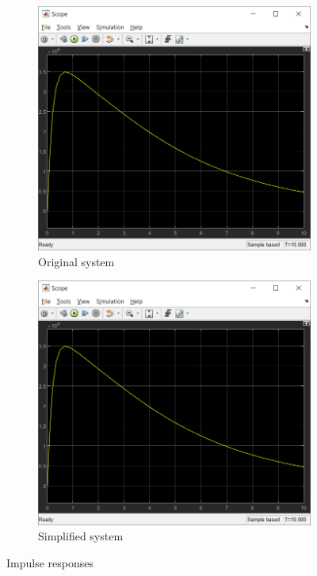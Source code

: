 \documentclass{article}
\begin{document}
\begin{figure}[ht]
   	 \centering
     \begin{subfigure}[b]{0.45\textwidth}
         \centering
         \includegraphics[width=\textwidth]{sources/image2_6.png}
         \caption{Original system}
         \label{fig:fig4}
     \end{subfigure}
     \hfill
     \begin{subfigure}[b]{0.45\textwidth}
         \centering
         \includegraphics[width=\textwidth]{sources/image2_7.png}
         \caption{Simplified system}
         \label{fig:fig5}
     \end{subfigure}
     \caption{Impulse responses}
\end{figure}
\end{document}
